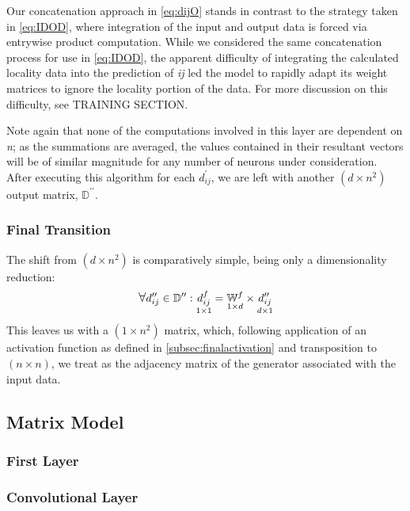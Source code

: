 Our concatenation approach in \eqref{eq:dijO} stands in contrast to the strategy 
taken in \eqref{eq:IDOD}, where integration of the input and output data is 
forced via entrywise product computation. While we considered the same 
concatenation process for use in \eqref{eq:IDOD}, the apparent difficulty of 
integrating the calculated locality data into the prediction of \textit{ij} led 
the model to rapidly adapt its weight matrices to ignore the locality portion of 
the data.  For more discussion on this difficulty, see TRAINING SECTION.

Note again that none of the computations involved in this layer are dependent on 
\textit{n}; as the summations are averaged, the values contained in their 
resultant vectors will be of similar magnitude for any number of neurons under 
consideration. After executing this algorithm for each $d_{ij}^{\prime}$, we are 
left with another $(d \times n^2)$ output matrix, $\mathbb{D}^{\prime\prime}$.

\subsubsection{Final Transition}
The shift from $(d \times n^2)$ is comparatively simple, being only a 
dimensionality reduction:
\begin{equation}
	\mathlarger\forall d_{ij}^{\prime\prime} \in \mathbb{D}^{\prime\prime}:
	\underset{1 \times 1}{d_{ij}^f} = \underset{1 \times d}{\mathbb{W}^f} \times 
	\underset{d \times 1}{d_{ij}^{\prime\prime}}
\end{equation}
This leaves us with a $(1 \times n^2)$ matrix, which, following application of 
an activation function as defined in \ref{subsec:finalactivation} and 
transposition to $(n \times n)$, we treat as the adjacency matrix of the 
generator associated with the input data.

\subsection{Matrix Model}
\label{subsec:matmodel}

\subsubsection{First Layer}
\label{subsubsec:matfirstlayer}

\subsubsection{Convolutional Layer}
\label{subsubsec:matconvlayer}


